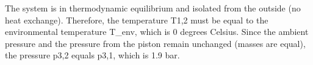 The system is in thermodynamic equilibrium and isolated from the outside (no heat exchange). Therefore, the temperature T1,2 must be equal to the environmental temperature T_env, which is 0 degrees Celsius. Since the ambient pressure and the pressure from the piston remain unchanged (masses are equal), the pressure p3,2 equals p3,1, which is 1.9 bar.